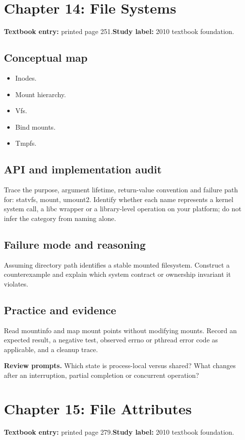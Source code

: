 \documentclass[11pt,letterpaper,oneside]{report}
\begin{document}
\section{Chapter 14: File Systems}
\textbf{Textbook entry:} printed page 251.\quad \textbf{Study label:} 2010 textbook foundation.

\subsection{Conceptual map}
\begin{itemize}
\item Inodes.
\item Mount hierarchy.
\item Vfs.
\item Bind mounts.
\item Tmpfs.
\end{itemize}
\subsection{API and implementation audit}
Trace the purpose, argument lifetime, return-value convention and failure path for: statvfs, mount, umount2. Identify whether each name represents a kernel system call, a libc wrapper or a library-level operation on your platform; do not infer the category from naming alone.

\subsection{Failure mode and reasoning}
Assuming directory path identifies a stable mounted filesystem. Construct a counterexample and explain which system contract or ownership invariant it violates.

\subsection{Practice and evidence}
Read mountinfo and map mount points without modifying mounts. Record an expected result, a negative test, observed errno or pthread error code as applicable, and a cleanup trace.

\textbf{Review prompts.} Which state is process-local versus shared? What changes after an interruption, partial completion or concurrent operation?

\section{Chapter 15: File Attributes}
\textbf{Textbook entry:} printed page 279.\quad \textbf{Study label:} 2010 textbook foundation.
\end{document}
